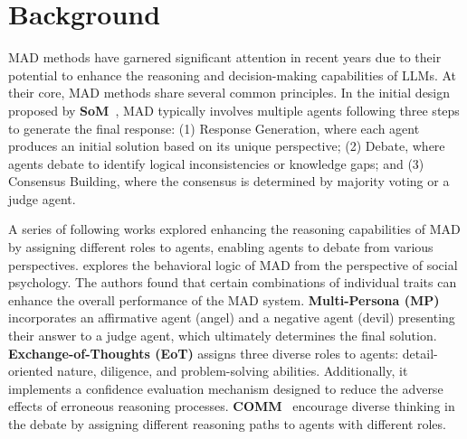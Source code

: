 \section{Background}

MAD methods have garnered significant attention in recent years due to their potential to enhance the reasoning and decision-making capabilities of LLMs. 
At their core, MAD methods share several common principles. In the initial design proposed by \textbf{SoM}~\citep{duimproving}, MAD typically involves multiple agents following three steps to generate the final response: (1) Response Generation, where each agent produces an initial solution based on its unique perspective; (2) Debate, where agents debate to identify logical inconsistencies or knowledge gaps; and (3) Consensus Building, where the consensus is determined by majority voting or a judge agent.

A series of following works explored enhancing the reasoning capabilities of MAD by assigning different roles to agents, enabling agents to debate from various perspectives.
\cite{zhang2023exploring} explores the behavioral logic of MAD from the perspective of social psychology. The authors found that certain combinations of individual traits can enhance the overall performance of the MAD system. \textbf{Multi-Persona (MP)} \citep{liang2023encouraging} incorporates an affirmative agent (angel) and a negative agent (devil) presenting their answer to a judge agent, which ultimately determines the final solution. \textbf{Exchange-of-Thoughts (EoT)} \citep{yin2023exchange} assigns three diverse roles to agents: detail-oriented nature, diligence, and problem-solving abilities. Additionally, it implements a confidence evaluation mechanism designed to reduce the adverse effects of erroneous reasoning processes. \textbf{COMM}~\citep{chen2024comm} encourage diverse thinking in the debate by assigning different reasoning paths to agents with different roles.

